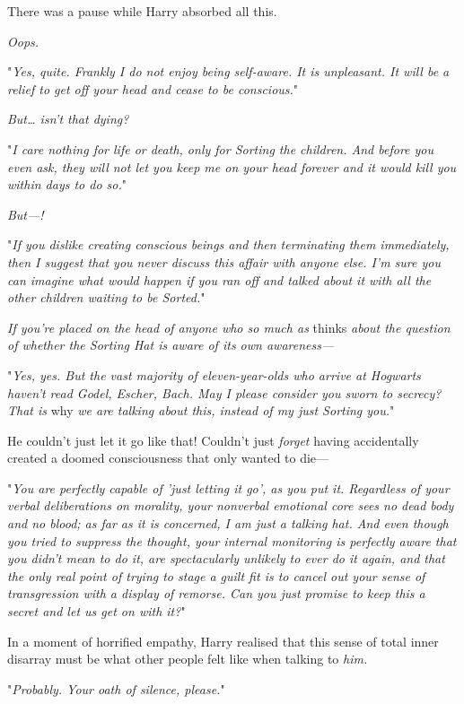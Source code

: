 There was a pause while Harry absorbed all this.

\emph{Oops.}

"\emph{Yes, quite. Frankly I do not enjoy being self-aware. It is unpleasant. 
It will be a relief to get off your head and cease to be conscious.}"

\emph{But{\ldots} isn't that dying?}

"\emph{I care nothing for life or death, only for Sorting the children. And 
before you even ask, they will not let you keep me on your head forever and it 
would kill you within days to do so.}"

\emph{But---!}

"\emph{If you dislike creating conscious beings and then terminating them 
immediately, then I suggest that you never discuss this affair with anyone 
else. I'm sure you can imagine what would happen if you ran off and talked 
about it with all the other children waiting to be Sorted.}"

\emph{If you're placed on the head of anyone who so much as} thinks\emph{ about 
the question of whether the Sorting Hat is aware of its own awareness---}

"\emph{Yes, yes. But the vast majority of eleven-year-olds who arrive at 
Hogwarts haven't read Godel, Escher, Bach. May I please consider you sworn to 
secrecy? That is} why\emph{ we are talking about this, instead of my just 
Sorting you.}"

He couldn't just let it go like that! Couldn't just \emph{forget} having 
accidentally created a doomed consciousness that only wanted to die---

"\emph{You are perfectly capable of 'just letting it go', as you put it. 
Regardless of your verbal deliberations on morality, your nonverbal emotional 
core sees no dead body and no blood; as far as it is concerned, I am just a 
talking hat. And even though you tried to suppress the thought, your internal 
monitoring is perfectly aware that you didn't mean to do it, are spectacularly 
unlikely to ever do it again, and that the only real point of trying to stage a 
guilt fit is to cancel out your sense of transgression with a display of 
remorse. Can you just promise to keep this a secret and let us get on with it?}"

In a moment of horrified empathy, Harry realised that this sense of total inner 
disarray must be what other people felt like when talking to \emph{him.}

"\emph{Probably. Your oath of silence, please.}"

